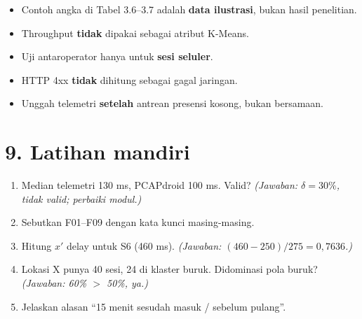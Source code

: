 \begin{awas}
\begin{itemize}
  \item Contoh angka di Tabel 3.6--3.7 adalah \textbf{data ilustrasi}, bukan hasil penelitian.
  \item Throughput \textbf{tidak} dipakai sebagai atribut K-Means.
  \item Uji antaroperator hanya untuk \textbf{sesi seluler}.
  \item HTTP 4xx \textbf{tidak} dihitung sebagai gagal jaringan.
  \item Unggah telemetri \textbf{setelah} antrean presensi kosong, bukan bersamaan.
\end{itemize}
\end{awas}

\section*{9. Latihan mandiri}
\begin{enumerate}
  \item Median telemetri 130 ms, PCAPdroid 100 ms. Valid? \textit{(Jawaban: $\delta=30\%$, tidak valid; perbaiki modul.)}
  \item Sebutkan F01--F09 dengan kata kunci masing-masing.
  \item Hitung $x'$ delay untuk S6 (460 ms). \textit{(Jawaban: $(460-250)/275=0{,}7636$.)}
  \item Lokasi X punya 40 sesi, 24 di klaster buruk. Didominasi pola buruk? \textit{(Jawaban: 60\% $>$ 50\%, ya.)}
  \item Jelaskan alasan ``15 menit sesudah masuk / sebelum pulang''.
\end{enumerate}

